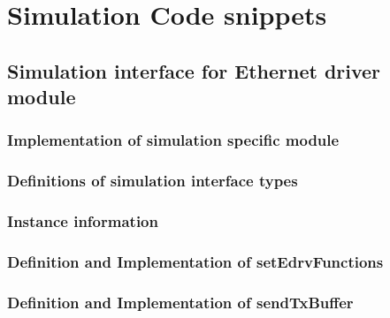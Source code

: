 \chapter{Simulation Code snippets}
\label{app:simulation}

\section{Simulation interface for Ethernet driver module}
\label{app:simulation_edrv}

\subsection{Implementation of simulation specific module}
\label{app:simulation_edrv_target}


\subsection{Definitions of simulation interface types}
\label{app:simulation_edrv_functions}


\subsection{Instance information}
\label{app:simulation_edrv_interface_instance}



\subsection{Definition and Implementation of setEdrvFunctions}
\label{app:simulation_edrv_interface_setfunc}




\subsection{Definition and Implementation of sendTxBuffer}
\label{app:simulation_edrv_interface_sendtx}



